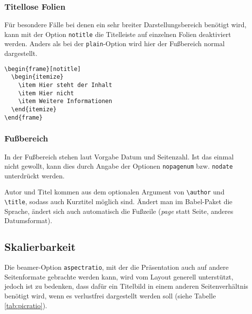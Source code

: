 \subsubsection{Titellose Folien}

Für besondere Fälle bei denen ein sehr breiter Darstellungsbereich benötigt
wird, kann mit der Option \lstinline{notitle} die Titelleiste auf einzelnen
Folien deaktiviert werden.
Anders als bei der \lstinline{plain}-Option wird hier
der Fußbereich normal dargestellt.

\begin{minipage}{0.5\textwidth}
\begin{verbatim}
\begin{frame}[notitle]
  \begin{itemize}
    \item Hier steht der Inhalt
    \item Hier nicht
    \item Weitere Informationen
  \end{itemize}
\end{frame}
\end{verbatim}
\end{minipage}
\begin{minipage}{0.5\textwidth}
\end{minipage}

\subsubsection{Fußbereich}

In der Fußbereich stehen laut Vorgabe Datum und Seitenzahl.
Ist das einmal nicht gewollt, kann dies durch Angabe der Optionen
\lstinline{nopagenum} bzw. \lstinline{nodate} unterdrückt werden.

Autor und Titel kommen aus dem optionalen Argument von \lstinline{\author}
und \lstinline{\title}, sodass auch Kurztitel möglich sind.
Ändert man im Babel-Paket die Sprache, ändert sich auch automatisch
die Fußzeile (\textit{page} statt Seite, anderes Datumsformat).


\subsection{Skalierbarkeit}

Die beamer-Option \lstinline{aspectratio}, mit der die Präsentation auch auf
andere Seitenformate gebrachte werden kann, wird vom Layout generell
unterstützt, jedoch ist zu bedenken, dass dafür ein Titelbild in einem anderen
Seitenverhältnis benötigt wird, wenn es verlustfrei dargestellt werden soll
(siehe Tabelle \ref{tab:picratio}).


